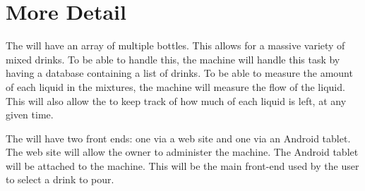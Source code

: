 \section{More Detail} %

The \subTitle{} will have an array of multiple bottles. This allows for
a massive variety of mixed drinks. To be able to handle this, the machine
will handle this task by having a database containing a list of drinks. 
To be able to measure the amount of each liquid in the mixtures, the 
machine will measure the flow of the liquid. This will also allow the 
\subTitle{} to keep track of how much of each liquid is left, at any given
time.

The \subTitle{} will have two front ends: one via a web site and one via an
Android tablet. The web site will allow the owner to administer the machine.
The Android tablet will be attached to the machine. This will be the main
front-end used by the user to select a drink to pour.
